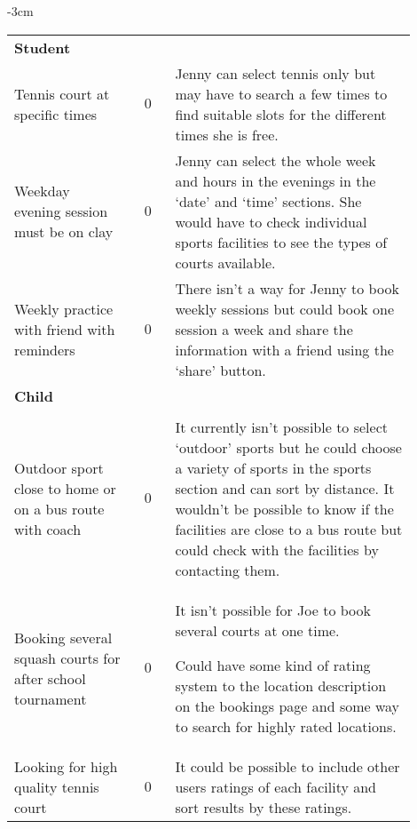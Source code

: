 \begin{center}
\begin{adjustwidth*}{}{-3cm}
\begin{longtable}{@{\extracolsep{\fill}}p{0.3\linewidth} c p{0.6\linewidth}}
		\midrule
		\multicolumn{3}{l}{\textbf{Student}}\\
		\cmidrule(r){1-3}
		Tennis court at specific times & $0$ & Jenny can select tennis only but
		may have to search a few times to find suitable slots for the different
		times she is free.\\

		Weekday evening session must be on clay & $0$ & Jenny can select the
		whole week and hours in the evenings in the `date' and `time' sections.
		She would have to check individual sports facilities to see the types
		of courts available.\\

		Weekly practice with friend with reminders & $0$ & There isn't a way
		for Jenny to book weekly sessions but could book one session a week and
		share the information with a friend using the `share' button.\\

		\midrule
		\multicolumn{3}{l}{\textbf{Child}}\\
		\cmidrule(r){1-3}\\
		Outdoor sport close to home or on a bus route with coach & $0$ & It
		currently isn't possible to select `outdoor' sports but he could choose
		a variety of sports in the sports section and can sort by distance. It
		wouldn't be possible to know if the facilities are close to a bus route
		but could check with the facilities by contacting them.\\

		Booking several squash courts for after school tournament & $0$ & It
		isn't possible for Joe to book several courts at one time.

		Could have some kind of rating system to the location description on
		the bookings page and some way to search for highly rated locations.\\

		Looking for high quality tennis court & $0$ & It could be possible to
		include other users ratings of each facility and sort results by these
		ratings.\\
		\bottomrule
	\end{longtable}
	\end{adjustwidth*}
\end{center}
